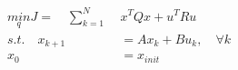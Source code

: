 \documentclass[preview]{standalone}
\begin{document}
\begin{align*}
\underset{q}{min}  J =  \quad \sum_{k=1}^N \; &x^TQx + u^T R u \\ s.t. \quad x_{k+1} &= Ax_k + Bu_k, \quad \forall k \\ x_0 &= x_{init}
\end{align*}
\end{document}
